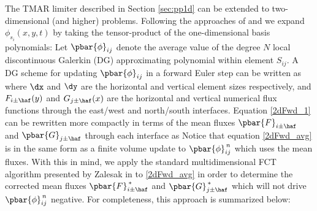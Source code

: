 \documentclass{ametsoc}
\begin{document}
The TMAR limiter described in Section \ref{sec:pp1d} can be extended to two-dimensional (and higher) problems. Following the approaches of\cite{nair2005discontinuous} and \cite{Lauritzen:2011aa} we expand $\phi_{s_i}(x,y,t)$ by taking the tensor-product of the one-dimensional basis polynomials:
Let $\pbar{\phi}_{ij}$ denote the average value of the degree $N$ local discontinuous Galerkin (DG) approximating polynomial within element $S_{ij}$. A DG scheme for updating $\pbar{\phi}_{ij}$ in a forward Euler step can be written as
where $\dx$ and $\dy$ are the horizontal and vertical element sizes respectively, and $F_{i\pm\haf}(y)$ and $G_{j\pm\haf}(x)$ are the horizontal and vertical numerical flux functions through the east/west and north/south interfaces. Equation \eqref{2dFwd_1} can be rewritten more compactly in terms of the mean fluxes $\pbar{F}_{i\pm \haf}$ and $\pbar{G}_{j\pm \haf}$ through each interface as 
Notice that equation \eqref{2dFwd_avg} is in the same form as a finite volume update to $\pbar{\phi}_{ij}^{\,n}$ which uses the mean fluxes. With this in mind, we apply the standard multidimensional FCT algorithm presented by Zalesak in \cite{Zalesak:1979aa} to \eqref{2dFwd_avg} in order to determine the corrected mean fluxes $\pbar{F}_{i\pm\haf}^{\,*}$ and $\pbar{G}_{j\pm\haf}^{\,*}$ which will not drive $\pbar{\phi}_{ij}^{\,n}$ negative. For completeness, this approach is summarized below:
\end{document}
